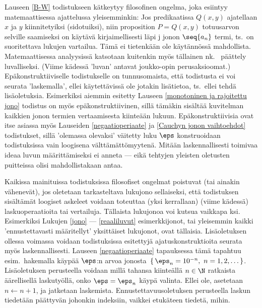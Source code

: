Lauseen \ref{B-W} todistukseen kätkeytyy filosofinen ongelma,
joka esiintyy matemaattisessa ajattelussa yleisemminkin: Jos predikaatissa $Q(x,y)$
ajatellaan $x$ ja $y$ kiinnitetyiksi (sidotuiksi), niin proposition $P = Q(x,y)$ totuusarvon
selville saamiseksi on käytävä kirjaimellisesti läpi j jonon $\seq{a_n}$ termi,
ts.\ on suoritettava   lukujen vartailua. Tämä ei tietenkään ole 
käytännössä mahdollista. Matemaattisessa analyysissä katsotaan kuitenkin myös tällainen nk.\ 
 päättely luvalliseksi. (Viime kädessä 'luvan' antavat joukko-opin 
perusaksioomat.) Epäkonstruktiiviselle todistukselle on tunnus\-omaista, että todistusta ei voi
seurata 'laskemalla', ellei käytettävissä ole jotakin lisätietoa, ts.\ ellei tehdä 
lisäoletuksia. Esimerkiksi aiemmin esitetty Lauseen \ref{monotoninen ja rajoitettu jono}
todistus on myös epäkonstruktiivinen, sillä tämäkin sisältää kuvitelman kaikkien jonon termien
vertaamisesta kiinteään lukuun. Epäkonstruktiivisia ovat itse asiassa myös Lauseiden 
\ref{negaatioperiaate} ja \ref{Cauchyn jonon vaihtoehdot} todistukset, sillä 
'olemassa olevaksi' väitetty luku $\eps$ konstruoidaan todistuksissa vain loogisena 
välttämättömyytenä. Mitään laskennallisesti toimivaa ideaa luvun määrittämiseksi ei anneta ---
eikä tehtyjen yleisten oletusten puitteissa olisi mahdollistakaan antaa.

Kaikissa mainituissa todistuksissa filosofiset ongelmat poistuvat (tai ainakin vähenevät), jos
oletetaan tarkasteltava lukujono sellaiseksi, että todistuksen sisältämät loogiset askeleet
voidaan toteuttaa (yksi kerrallaan) \pain{äärellisellä} \pain{määrällä} (viime kädessä)
\pain{rationaalisia} laskuoperaatioita tai vertailuja. Tällaista lukujonoa voi kutsua
vaikkapa \kor{ennustettava}ksi. Esimerkiksi Lukujen \ref{jono} --- \ref{reaaliluvut}
esimerkkijonot, tai yleisemmin kaikki 'ennustettavasti määritellyt' yksittäiset lukujonot, ovat
tällaisia. Lisäoletuksen ollessa voimassa voidaan todistuksissa esitettyjä ajatuskonstruktioita
seurata myös laskennallisesti. Lauseen \ref{negaatioperiaate} tapauksessa tämä tapahtuu esim.\ 
hakemalla käypää $\eps$:n arvoa jonosta $\,\{\,\eps_n = 10^{-n},\ n = 1,2, \ldots\,\}$.
Lisäoletuksen perusteella voidaan millä tahansa kiinteällä $n \in \N$ ratkaista äärellisellä
laskutyöllä, onko $\eps = \eps_n$ käypä valinta. Ellei ole, asetetaan $n \leftarrow n+1$, ja 
jatketaan laskemista. Ennustettavuusoletuksen perusteella laskun tiedetään päättyvän johonkin
indeksiin, vaikkei etukäteen tiedetä, mihin. 


